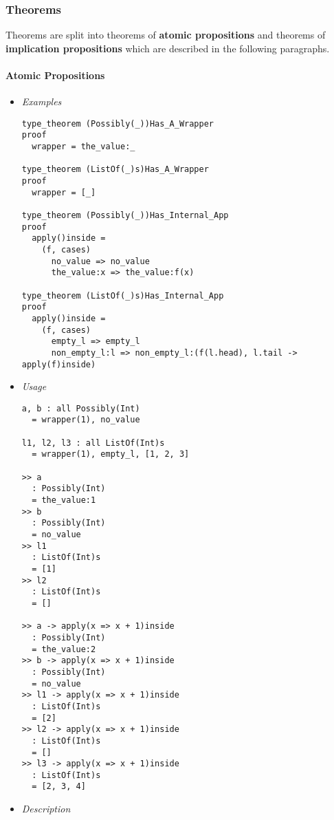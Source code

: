 \documentclass{article}
\begin{document}
\subsubsection{Theorems}
\label{subsubsec:ttheo}

Theorems are split into theorems of \textbf{atomic propositions} and
theorems of \textbf{implication propositions} which are described in the
following paragraphs.

\paragraph{Atomic Propositions}

\begin{itemize}
\item \textit{Examples}

\begin{verbatim}
type_theorem (Possibly(_))Has_A_Wrapper
proof
  wrapper = the_value:_

type_theorem (ListOf(_)s)Has_A_Wrapper
proof
  wrapper = [_]

type_theorem (Possibly(_))Has_Internal_App
proof
  apply()inside =
    (f, cases)
      no_value => no_value
      the_value:x => the_value:f(x)

type_theorem (ListOf(_)s)Has_Internal_App
proof
  apply()inside =
    (f, cases)
      empty_l => empty_l
      non_empty_l:l => non_empty_l:(f(l.head), l.tail -> apply(f)inside)
\end{verbatim}

\item \textit{Usage}

\begin{verbatim} 
a, b : all Possibly(Int)
  = wrapper(1), no_value

l1, l2, l3 : all ListOf(Int)s
  = wrapper(1), empty_l, [1, 2, 3]

>> a
  : Possibly(Int)
  = the_value:1
>> b
  : Possibly(Int)
  = no_value
>> l1
  : ListOf(Int)s
  = [1]
>> l2
  : ListOf(Int)s
  = []

>> a -> apply(x => x + 1)inside
  : Possibly(Int)
  = the_value:2
>> b -> apply(x => x + 1)inside
  : Possibly(Int)
  = no_value
>> l1 -> apply(x => x + 1)inside
  : ListOf(Int)s
  = [2]
>> l2 -> apply(x => x + 1)inside
  : ListOf(Int)s
  = []
>> l3 -> apply(x => x + 1)inside
  : ListOf(Int)s
  = [2, 3, 4]
\end{verbatim}

\item \textit{Description}


\end{itemize}
\end{document}
